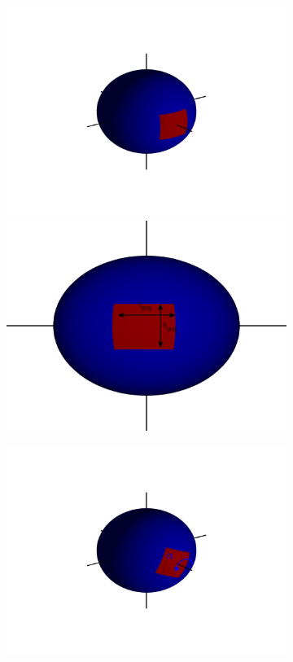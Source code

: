 \documentclass[11pt]{article}
\begin{document}
\begin{figure}
\begin{subfigure}{0.2\textwidth}
\includegraphics[width=\textwidth]{sphere_1}
\includegraphics[width=\textwidth]{sphere2_1}
\caption{}
\end{subfigure}
\begin{subfigure}{0.2\textwidth}
\includegraphics[width=\textwidth]{sphere_2}

\end{subfigure}
\end{figure}
\end{document}
